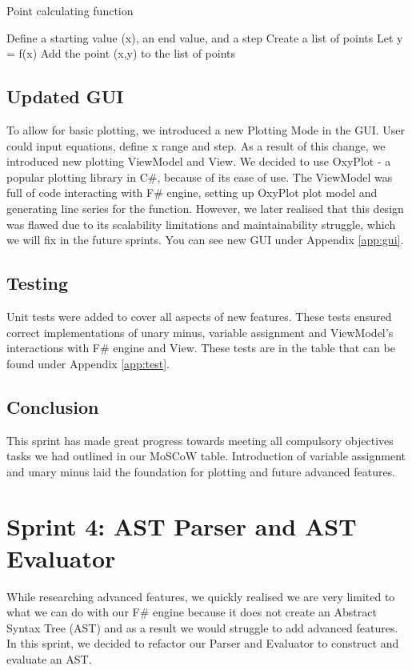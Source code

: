\documentclass[a4paper, oneside, 11pt]{report}
\begin{document}
\begin{algorithm}[th]
\caption{ Point calculating function }
\begin{algorithmic}[1]
\STATE Define a starting value (x), an end value, and a step
\STATE Create a list of points
    \STATE Let y = f(x)
    \STATE Add the point (x,y) to the list of points
\ENDWHILE
\end{algorithmic}
\end{algorithm}

\subsection{Updated GUI}
To allow for basic plotting, we introduced a new Plotting Mode in the GUI. User could input equations, define x range and step. As a result of this change, we introduced new plotting ViewModel and View. We decided to use OxyPlot\cite{Oxyplot} - a popular plotting library in C\#, because of its ease of use. The ViewModel was full of code interacting with F\# engine, setting up OxyPlot plot model and generating line series for the function. However, we later realised that this design was flawed due to its scalability limitations and maintainability struggle, which we will fix in the future sprints. You can see new GUI under Appendix \ref{app:gui}.

\subsection{Testing}
Unit tests were added to cover all aspects of new features. These tests ensured correct implementations of unary minus, variable assignment and ViewModel’s interactions with F\# engine and View. These tests are in the table that can be found under Appendix \ref{app:test}.


\subsection{Conclusion}
This sprint has made great progress towards meeting all compulsory objectives tasks we had outlined in our MoSCoW table. Introduction of variable assignment and unary minus laid the foundation for plotting and future advanced features.



\section{Sprint 4: AST Parser and AST Evaluator}
While researching advanced features, we quickly realised we are very limited to what we can do with our F\# engine because it does not create an Abstract Syntax Tree (AST) and as a result we would struggle to add advanced features. In this sprint, we decided to refactor our Parser and Evaluator to construct and evaluate an AST.
\end{document}
